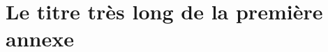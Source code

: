 \documentclass[12pt,twoside]{book}
\begin{document}

\appendix %

\chapter[Titre court]{Le titre très long de la première annexe}

%

\newpage{\pagestyle{empty}\cleardoublepage}


\backmatter %

\tableofcontents
\end{document}
